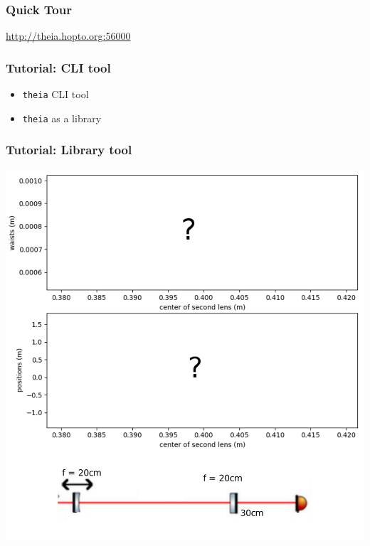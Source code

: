 \documentclass{beamer}
\begin{document}
\begin{frame}
\frametitle{Quick Tour}

\url{http://theia.hopto.org:56000}
\end{frame}


\begin{frame}
\frametitle{Tutorial: CLI tool }
\begin{itemize}
\item \texttt{theia} CLI tool
\item \texttt{theia} as a library
\end{itemize}
\end{frame}

\begin{frame}
\frametitle{Tutorial: Library tool }
\begin{center}
\includegraphics[scale=.3]{emptygraph.pdf}
\end{center}



\end{frame}
\end{document}
